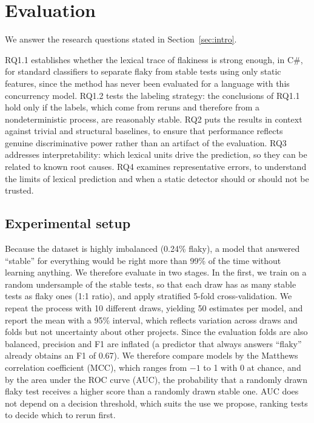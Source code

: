 \section{Evaluation}
\label{sec:evaluation}
We answer the research questions stated in Section~\ref{sec:intro}. 

 RQ1.1 establishes whether the lexical trace of flakiness is strong enough, in C\#, for standard classifiers to separate flaky from stable tests using only static features, since the method has never been evaluated for a language with this concurrency model. RQ1.2 tests the labeling strategy: the conclusions of RQ1.1 hold only if the labels, which come from reruns and therefore from a nondeterministic process, are reasonably stable. RQ2 puts the results in context against trivial and structural baselines, to ensure that performance reflects genuine discriminative power rather than an artifact of the evaluation. RQ3 addresses interpretability: which lexical units drive the prediction, so they can be related to known root causes. RQ4 examines representative errors, to understand the limits of lexical prediction and when a static detector should or should not be trusted.

\subsection{Experimental setup}
\label{sec:setup}
Because the dataset is highly imbalanced (0.24\% flaky), a model that answered ``stable'' for everything would be right more than 99\% of the time without learning anything. We therefore evaluate in two stages. In the first, we train on a random undersample of the stable tests, so that each draw has as many stable tests as flaky ones (1:1 ratio), and apply stratified 5-fold cross-validation. We repeat the process with 10 different draws, yielding 50 estimates per model, and report the mean with a 95\% interval, which reflects variation across draws and folds but not uncertainty about other projects. Since the evaluation folds are also balanced, precision and F1 are inflated (a predictor that always answers ``flaky'' already obtains an F1 of 0.67). We therefore compare models by the Matthews correlation coefficient (MCC), which ranges from $-1$ to 1 with 0 at chance, and by the area under the ROC curve (AUC), the probability that a randomly drawn flaky test receives a higher score than a randomly drawn stable one. AUC does not depend on a decision threshold, which suits the use we propose, ranking tests to decide which to rerun first. 

